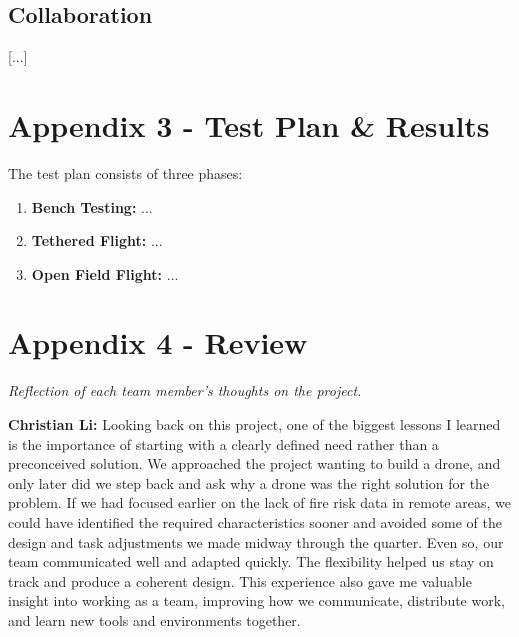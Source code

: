 \documentclass[journal, onecolumn]{IEEEtran}
\begin{document}
\subsection{Collaboration}
[...]

\newpage

\section{Appendix 3 - Test Plan \& Results}

The test plan consists of three phases:
\begin{enumerate}
    \item \textbf{Bench Testing:} ...
    \item \textbf{Tethered Flight:} ...
    \item \textbf{Open Field Flight:} ...
\end{enumerate}

\newpage

\section{Appendix 4 - Review}

\textit{Reflection of each team member's thoughts on the project.}

\vspace{1em}

\textbf{Christian Li:} Looking back on this project, one of the biggest lessons I learned is the importance of starting with a clearly defined need rather than a preconceived solution. We approached the project wanting to build a drone, and only later did we step back and ask why a drone was the right solution for the problem. If we had focused earlier on the lack of fire risk data in remote areas, we could have identified the required characteristics sooner and avoided some of the design and task adjustments we made midway through the quarter. Even so, our team communicated well and adapted quickly. The flexibility helped us stay on track and produce a coherent design. This experience also gave me valuable insight into working as a team, improving how we communicate, distribute work, and learn new tools and environments together.

\vspace{1em}
\end{document}
